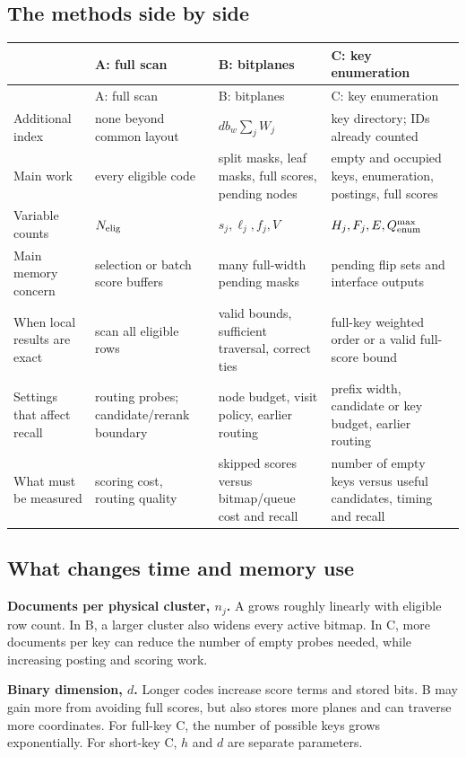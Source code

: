 \subsection{The methods side by side}
\small
\begin{longtable}{@{}P{.16\linewidth}P{.25\linewidth}P{.25\linewidth}P{.25\linewidth}@{}}
\toprule & A: full scan & B: bitplanes & C: key enumeration\\\midrule\endfirsthead
\toprule & A: full scan & B: bitplanes & C: key enumeration\\\midrule\endhead
Additional index & none beyond common layout & $d b_w\sum_jW_j$ & key directory; IDs already counted\\
Main work & every eligible code & split masks, leaf masks, full scores, pending nodes & empty and occupied keys, enumeration, postings, full scores\\
Variable counts & $N_{\mathrm{elig}}$ & $s_j,\ell_j,f_j,V$ & $H_j,F_j,E,Q_{\rm enum}^{\max}$\\
Main memory concern & selection or batch score buffers & many full-width pending masks & pending flip sets and interface outputs\\
When local results are exact & scan all eligible rows & valid bounds, sufficient traversal, correct ties & full-key weighted order or a valid full-score bound\\
Settings that affect recall & routing probes; candidate/rerank boundary & node budget, visit policy, earlier routing & prefix width, candidate or key budget, earlier routing\\
What must be measured & scoring cost, routing quality & skipped scores versus bitmap/queue cost and recall & number of empty keys versus useful candidates, timing and recall\\\bottomrule
\end{longtable}
\normalsize

\subsection{What changes time and memory use}
\textbf{Documents per physical cluster, $n_j$.} A grows roughly linearly with eligible row
count. In B, a larger cluster also widens every active bitmap. In C, more documents per key can
reduce the number of empty probes needed, while increasing posting and scoring work.

\textbf{Binary dimension, $d$.} Longer codes increase score terms and stored bits. B may gain
more from avoiding full scores, but also stores more planes and can traverse more coordinates.
For full-key C, the number of possible keys grows exponentially. For short-key C, $h$ and $d$
are separate parameters.

